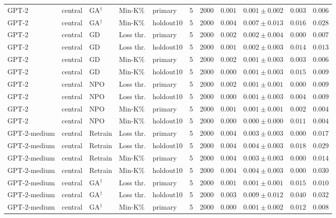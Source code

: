 {\begin{longtable}{@{\extracolsep{\fill}}lllllcccccc@{}}
GPT-2 & central & GA$^{\dagger}$ & Min-K\% & primary & 5 & 2000 & $0.001$ & $0.001 \pm 0.002$ & $0.003$ & $0.006$ \\
GPT-2 & central & GA$^{\dagger}$ & Min-K\% & holdout10 & 5 & 2000 & $0.004$ & $0.007 \pm 0.013$ & $0.016$ & $0.028$ \\
GPT-2 & central & GD & Loss thr. & primary & 5 & 2000 & $0.002$ & $0.002 \pm 0.004$ & $0.000$ & $0.007$ \\
GPT-2 & central & GD & Loss thr. & holdout10 & 5 & 2000 & $0.001$ & $0.002 \pm 0.003$ & $0.014$ & $0.013$ \\
GPT-2 & central & GD & Min-K\% & primary & 5 & 2000 & $0.002$ & $0.001 \pm 0.003$ & $0.003$ & $0.006$ \\
GPT-2 & central & GD & Min-K\% & holdout10 & 5 & 2000 & $0.000$ & $0.001 \pm 0.003$ & $0.015$ & $0.009$ \\
GPT-2 & central & NPO & Loss thr. & primary & 5 & 2000 & $0.002$ & $0.001 \pm 0.001$ & $0.000$ & $0.009$ \\
GPT-2 & central & NPO & Loss thr. & holdout10 & 5 & 2000 & $0.000$ & $0.001 \pm 0.003$ & $0.004$ & $0.009$ \\
GPT-2 & central & NPO & Min-K\% & primary & 5 & 2000 & $0.001$ & $0.001 \pm 0.001$ & $0.002$ & $0.004$ \\
GPT-2 & central & NPO & Min-K\% & holdout10 & 5 & 2000 & $0.000$ & $0.000 \pm 0.000$ & $0.011$ & $0.004$ \\
GPT-2-medium & central & Retrain & Loss thr. & primary & 5 & 2000 & $0.004$ & $0.003 \pm 0.003$ & $0.000$ & $0.017$ \\
GPT-2-medium & central & Retrain & Loss thr. & holdout10 & 5 & 2000 & $0.004$ & $0.004 \pm 0.003$ & $0.018$ & $0.029$ \\
GPT-2-medium & central & Retrain & Min-K\% & primary & 5 & 2000 & $0.004$ & $0.003 \pm 0.003$ & $0.000$ & $0.014$ \\
GPT-2-medium & central & Retrain & Min-K\% & holdout10 & 5 & 2000 & $0.004$ & $0.004 \pm 0.003$ & $0.000$ & $0.030$ \\
GPT-2-medium & central & GA$^{\dagger}$ & Loss thr. & primary & 5 & 2000 & $0.001$ & $0.001 \pm 0.001$ & $0.015$ & $0.010$ \\
GPT-2-medium & central & GA$^{\dagger}$ & Loss thr. & holdout10 & 5 & 2000 & $0.003$ & $0.009 \pm 0.012$ & $0.040$ & $0.032$ \\
GPT-2-medium & central & GA$^{\dagger}$ & Min-K\% & primary & 5 & 2000 & $0.000$ & $0.001 \pm 0.002$ & $0.012$ & $0.008$ \\

\end{longtable}}
